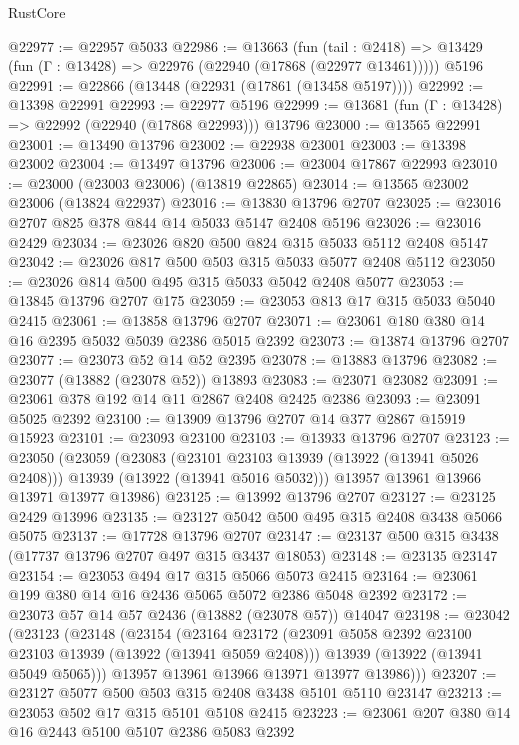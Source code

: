 \begin{lexlean}{RustCore}
\begin{coremodule}
@22977 := @22957 @5033
@22986 := @13663
    (fun (tail : @2418) => @13429 (fun (Γ : @13428) => @22976 (@22940 (@17868 (@22977 @13461)))))
    @5196
@22991 := @22866 (@13448 (@22931 (@17861 (@13458 @5197))))
@22992 := @13398 @22991
@22993 := @22977 @5196
@22999 := @13681 (fun (Γ : @13428) => @22992 (@22940 (@17868 @22993))) @13796
@23000 := @13565 @22991
@23001 := @13490 @13796
@23002 := @22938 @23001
@23003 := @13398 @23002
@23004 := @13497 @13796
@23006 := @23004 @17867 @22993
@23010 := @23000 (@23003 @23006) (@13819 @22865)
@23014 := @13565 @23002 @23006 (@13824 @22937)
@23016 := @13830 @13796 @2707
@23025 := @23016 @2707 @825 @378 @844 @14 @5033 @5147 @2408 @5196
@23026 := @23016 @2429
@23034 := @23026 @820 @500 @824 @315 @5033 @5112 @2408 @5147
@23042 := @23026 @817 @500 @503 @315 @5033 @5077 @2408 @5112
@23050 := @23026 @814 @500 @495 @315 @5033 @5042 @2408 @5077
@23053 := @13845 @13796 @2707 @175
@23059 := @23053 @813 @17 @315 @5033 @5040 @2415
@23061 := @13858 @13796 @2707
@23071 := @23061 @180 @380 @14 @16 @2395 @5032 @5039 @2386 @5015 @2392
@23073 := @13874 @13796 @2707
@23077 := @23073 @52 @14 @52 @2395
@23078 := @13883 @13796
@23082 := @23077 (@13882 (@23078 @52)) @13893
@23083 := @23071 @23082
@23091 := @23061 @378 @192 @14 @11 @2867 @2408 @2425 @2386
@23093 := @23091 @5025 @2392
@23100 := @13909 @13796 @2707 @14 @377 @2867 @15919 @15923
@23101 := @23093 @23100
@23103 := @13933 @13796 @2707
@23123 := @23050
    (@23059
      (@23083
        (@23101 @23103 @13939 (@13922 (@13941 @5026 @2408)))
        @13939
        (@13922 (@13941 @5016 @5032)))
      @13957
      @13961
      @13966
      @13971
      @13977
      @13986)
@23125 := @13992 @13796 @2707
@23127 := @23125 @2429 @13996
@23135 := @23127 @5042 @500 @495 @315 @2408 @3438 @5066 @5075
@23137 := @17728 @13796 @2707
@23147 := @23137 @500 @315 @3438 (@17737 @13796 @2707 @497 @315 @3437 @18053)
@23148 := @23135 @23147
@23154 := @23053 @494 @17 @315 @5066 @5073 @2415
@23164 := @23061 @199 @380 @14 @16 @2436 @5065 @5072 @2386 @5048 @2392
@23172 := @23073 @57 @14 @57 @2436 (@13882 (@23078 @57)) @14047
@23198 := @23042
    (@23123
      (@23148
        (@23154
          (@23164
            @23172
            (@23091 @5058 @2392 @23100 @23103 @13939 (@13922 (@13941 @5059 @2408)))
            @13939
            (@13922 (@13941 @5049 @5065)))
          @13957
          @13961
          @13966
          @13971
          @13977
          @13986)))
@23207 := @23127 @5077 @500 @503 @315 @2408 @3438 @5101 @5110 @23147
@23213 := @23053 @502 @17 @315 @5101 @5108 @2415
@23223 := @23061 @207 @380 @14 @16 @2443 @5100 @5107 @2386 @5083 @2392

\end{coremodule}
\end{lexlean}
